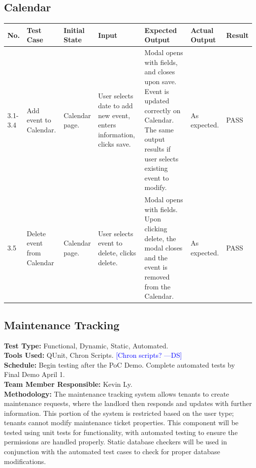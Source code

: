 \documentclass[12pt]{article}
\newcommand{\authornote}[3]{\textcolor{#1}{[#3 ---#2]}}
\newcommand{\authornote}[3]{}
\newcommand{\ds}[1]{\authornote{blue}{DS}{#1}}
\begin{document}
\subsection{Calendar}

\begin{longtable}{|p{1.5cm}|p{1.5cm}|p{1.5cm}|p{2cm}|p{4cm}|p{2cm}|p{1.5cm}|}
\hline
\textbf{No.} & \textbf{Test Case}  & \textbf{Initial State} & \textbf{Input} & \textbf{Expected Output} & \textbf{Actual Output} & \textbf{Result}\\ 
\hline
3.1-3.4 & Add event to Calendar. & Calendar page. & User selects date to add new event, enters information, clicks save. & Modal opens with fields, and closes upon save. Event is updated correctly on Calendar. The same output results if user selects existing event to modify. & As expected. & PASS \\
\hline
3.5 & Delete event from Calendar & Calendar page. & User selects  event to delete, clicks delete. & Modal opens with fields. Upon clicking delete, the modal closes and the event is removed from the Calendar. & As expected. & PASS \\
\hline
\end{longtable}

\subsection{Maintenance Tracking}
\textbf{Test Type:} Functional, Dynamic, Static, Automated. \\
\textbf{Tools Used:} QUnit, Chron Scripts. \ds{Chron scripts?}\\
\textbf{Schedule:} Begin testing after the PoC Demo. Complete automated tests by Final Demo April 1. \\
\textbf{Team Member Responsible:} Kevin Ly. \\
\textbf{Methodology:} The maintenance tracking system allows tenants to create maintenance requests, where the landlord then responds and updates with further information. This portion of the system is restricted based on the user type; tenants cannot modify maintenance ticket properties. This component will be tested using unit tests for functionality, with automated testing to ensure the permissions are handled properly. Static database checkers will be used in conjunction with the automated test cases to check for proper database modifications.
\end{document}
